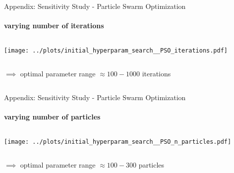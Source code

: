 \documentclass[11pt,aspectratio=169]{beamer}
\begin{document}
%
%
\begin{closingframe}{Appendix: Sensitivity Study - Particle Swarm Optimization}
    \label{sec:sensitivity_study_pso_appendix}
    \framesubtitle{varying \textbf{number of iterations}}

    \begin{columns}
    \begin{column}{0.8\textwidth}
        \texttt{[image: ../plots/initial\_hyperparam\_search\_\_PSO\_iterations.pdf]}
    \end{column}
    \end{columns}

    \begin{columns}
        \begin{column}{0.8\textwidth}
            $\implies$ optimal parameter range $\approx 100-1000$ iterations
        \end{column}
        \begin{column}{0.1\textwidth}
            \tiny{}
        \end{column}
    \end{columns}
\end{closingframe}

%
%

\begin{closingframe}{Appendix: Sensitivity Study - Particle Swarm Optimization}
    \framesubtitle{varying \textbf{number of particles}}

    \begin{columns}
    \begin{column}{0.8\textwidth}
        \texttt{[image: ../plots/initial\_hyperparam\_search\_\_PSO\_n\_particles.pdf]}
    \end{column}
    \end{columns}

    \begin{columns}
        \begin{column}{0.8\textwidth}
            $\implies$ optimal parameter range $\approx 100-300$ particles
        \end{column}
        \begin{column}{0.1\textwidth}
            \tiny{}
        \end{column}
    \end{columns}
\end{closingframe}
\end{document}
